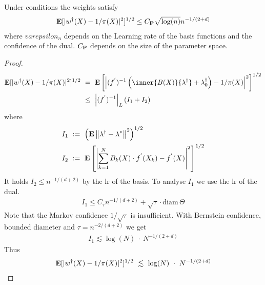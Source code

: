 \begin{theorem}
  Under conditions
  the weights satisfy
  \begin{gather}
    \E
    [
    |
    w^\dagger(X)
    -
    1/\pi(X)
    |
    ^2
    ]
    ^{1/2}
    \le
    C_\P
  \sqrt{\log(n)}
  n^{-1/(2+d)}
  \end{gather}
  where 
  $varepsilon_n$ depends on the Learning rate of the basis functions
  and the confidence of the dual.
  $C_\P$ depends on the size of the parameter space.
\end{theorem}
\begin{proof}
  \begin{align}
    \E
    [
    |
    w^\dagger(X)
    -
    1/\pi(X)
    |
    ^2
    ]
    ^{1/2}
    &
    \ 
    =
    \ 
    \E
    \left[ 
    \left| 
    (f^{'})^{-1}
    \left( 
      \inner
      {B(X)}
      {\lambda^\dagger}
      +
      \lambda_0^\dagger
    \right)
    -
    1/\pi(X)
    \right|
    ^2
    \right]
    ^{1/2}
    \\
    &
    \ 
    \le
    \ 
    \left| 
    (f^{'})^{-1}
    \right|_L
    \left( 
      I_1 + I_2
    \right)
  \end{align}
  where
  \begin{align}
    I_1
    & 
    \ 
    :=
    \ 
    \left( 
    \E\norm{\lambda^\dagger-\lambda^*}^2
    \right)
    ^{1/2}
    \\
    I_2
    & 
    \ 
    :=
    \ 
      \E
      \left[ 
        \left| 
        \sum_{k=1}^{N} 
        B_k(X)\cdot 
        f^{'}(X_k)
        -
        f^{'}(X)
        \right|
        ^2
      \right]
    ^{1/2}
  \end{align}
  It holds 
  $I_2\le n^{-1/(d+2)}$
  by the lr of the basis.
  To analyse $I_1$ we use the lr of the dual.
  \begin{align}
   I_1
   \le
   C_\tau
   n^{-1/(d+2)}
   +
   \sqrt{\tau}
   \cdot
   \mathrm{diam}\,\Theta
  \end{align}
Note that the Markov confidence $1/\sqrt{\tau}$ is insufficient. 
With Bernstein confidence, bounded diameter and $\tau=n^{-2/(d+2)}$
we get
\begin{gather}
  I_1
  \lesssim
  \log(N)
  \ 
  \cdot
  \ 
  N^{-1/(2+d)}
\end{gather}
Thus
\begin{gather}
    \E
    [
    |
    w^\dagger(X)
    -
    1/\pi(X)
    |
    ^2
    ]
    ^{1/2}
    \ 
  \lesssim
    \ 
  \log(N)
  \ 
  \cdot
  \ 
  N^{-1/(2+d)}
\end{gather}
\end{proof}
